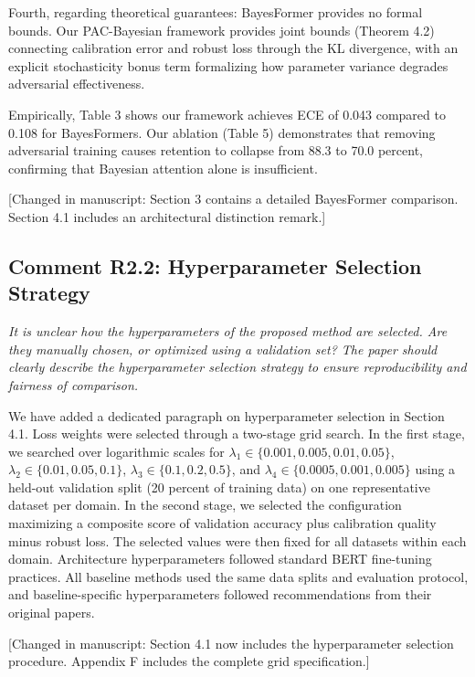 \documentclass[12pt,a4paper]{article}
\newcommand{\reviewertext}[1]{\textcolor{reviewercolor}{\textit{#1}}}
\newcommand{\response}[1]{\textcolor{responsecolor}{#1}}
\newcommand{\changed}[1]{\textcolor{changecolor}{[Changed in manuscript: #1]}}
\begin{document}
\response{Fourth, regarding theoretical guarantees: BayesFormer provides no formal bounds. Our PAC-Bayesian framework provides joint bounds (Theorem 4.2) connecting calibration error and robust loss through the KL divergence, with an explicit stochasticity bonus term formalizing how parameter variance degrades adversarial effectiveness.}

\response{Empirically, Table 3 shows our framework achieves ECE of 0.043 compared to 0.108 for BayesFormers. Our ablation (Table 5) demonstrates that removing adversarial training causes retention to collapse from 88.3 to 70.0 percent, confirming that Bayesian attention alone is insufficient.}

\changed{Section 3 contains a detailed BayesFormer comparison. Section 4.1 includes an architectural distinction remark.}

\bigskip

\subsection*{Comment R2.2: Hyperparameter Selection Strategy}

\reviewertext{It is unclear how the hyperparameters of the proposed method are selected. Are they manually chosen, or optimized using a validation set? The paper should clearly describe the hyperparameter selection strategy to ensure reproducibility and fairness of comparison.}

\bigskip

\response{We have added a dedicated paragraph on hyperparameter selection in Section 4.1. Loss weights were selected through a two-stage grid search. In the first stage, we searched over logarithmic scales for $\lambda_1 \in \{0.001, 0.005, 0.01, 0.05\}$, $\lambda_2 \in \{0.01, 0.05, 0.1\}$, $\lambda_3 \in \{0.1, 0.2, 0.5\}$, and $\lambda_4 \in \{0.0005, 0.001, 0.005\}$ using a held-out validation split (20 percent of training data) on one representative dataset per domain. In the second stage, we selected the configuration maximizing a composite score of validation accuracy plus calibration quality minus robust loss. The selected values were then fixed for all datasets within each domain. Architecture hyperparameters followed standard BERT fine-tuning practices. All baseline methods used the same data splits and evaluation protocol, and baseline-specific hyperparameters followed recommendations from their original papers.}

\changed{Section 4.1 now includes the hyperparameter selection procedure. Appendix F includes the complete grid specification.}
\end{document}
